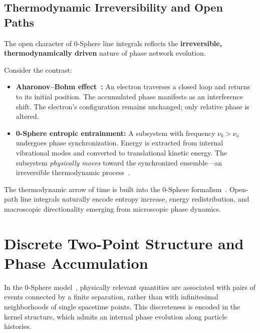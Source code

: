 \documentclass[12pt,letterpaper]{article}
\begin{document}
\subsection{Thermodynamic Irreversibility and Open Paths}

The open character of 0-Sphere line integrals reflects the \textbf{irreversible, thermodynamically driven} nature of phase network evolution.

Consider the contrast:
\begin{itemize}
\item \textbf{Aharonov--Bohm effect~\cite{ABEffect}:} An electron traverses a closed loop and returns to its initial position. The accumulated phase manifests as an interference shift. The electron's configuration remains unchanged; only relative phase is altered.

\item \textbf{0-Sphere entropic entrainment:} A subsystem with frequency $\nu_b > \nu_a$ undergoes phase synchronization. Energy is extracted from internal vibrational modes and converted to translational kinetic energy. The subsystem \textit{physically moves} toward the synchronized ensemble---an irreversible thermodynamic process~\cite{hanamura18356895}.
\end{itemize}

The thermodynamic arrow of time is built into the 0-Sphere formalism~\cite{hanamura16759284}. Open-path line integrals naturally encode entropy increase, energy redistribution, and macroscopic directionality emerging from microscopic phase dynamics.


\section{Discrete Two-Point Structure and Phase Accumulation}
\label{sec:twokernel}

\justifying
In the 0-Sphere model~\cite{hanamura16759284}, physically relevant quantities are associated with pairs of events connected by a finite separation, rather than with infinitesimal neighborhoods of single spacetime points. This discreteness is encoded in the kernel structure, which admits an internal phase evolution along particle histories.
\end{document}

